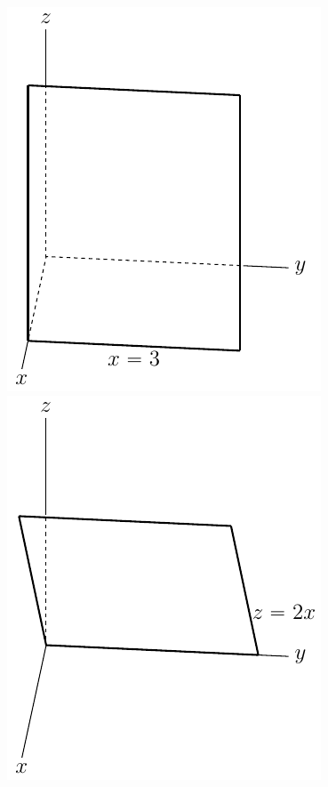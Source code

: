 \begin{solution}
\begin{center}
\includegraphics[scale=0.7]{fig/OE14D_9a.pdf}\qquad
\includegraphics[scale=0.7]{fig/OE14D_9b.pdf}\qquad

\end{center}
\end{solution}
